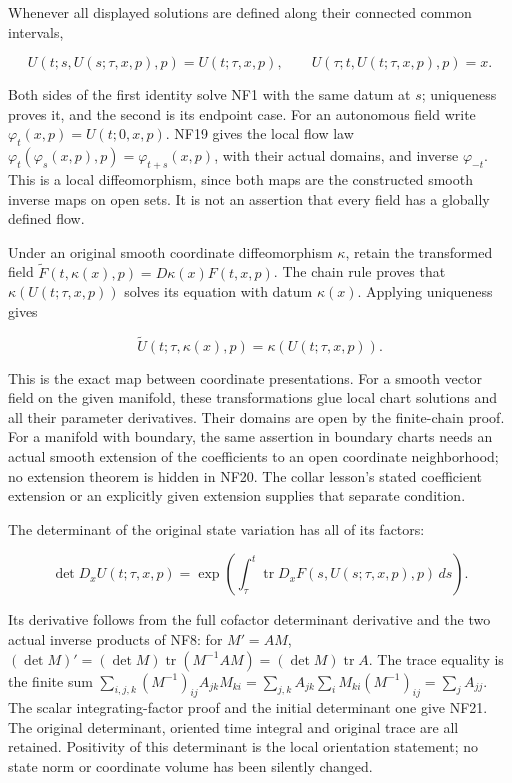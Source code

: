 \documentclass[
  11pt,
]{article}
\begin{document}
Whenever all displayed solutions are defined along their connected
common intervals,

\[
 U(t;s,U(s;\tau,x,p),p)=U(t;\tau,x,p),\qquad
 U(\tau;t,U(t;\tau,x,p),p)=x.
 \tag{NF19}
\]

Both sides of the first identity solve NF1 with the same datum at \(s\);
uniqueness proves it, and the second is its endpoint case. For an
autonomous field write \(\varphi_t(x,p)=U(t;0,x,p)\). NF19 gives the
local flow law \(\varphi_t(\varphi_s(x,p),p)=\varphi_{t+s}(x,p)\), with
their actual domains, and inverse \(\varphi_{-t}\). This is a local
diffeomorphism, since both maps are the constructed smooth inverse maps
on open sets. It is not an assertion that every field has a globally
defined flow.

Under an original smooth coordinate diffeomorphism \(\kappa\), retain
the transformed field
\(\widetilde F(t,\kappa(x),p)=D\kappa(x)F(t,x,p)\). The chain rule
proves that \(\kappa(U(t;\tau,x,p))\) solves its equation with datum
\(\kappa(x)\). Applying uniqueness gives

\[
 \widetilde U(t;\tau,\kappa(x),p)
       =\kappa(U(t;\tau,x,p)).
 \tag{NF20}
\]

This is the exact map between coordinate presentations. For a smooth
vector field on the given manifold, these transformations glue local
chart solutions and all their parameter derivatives. Their domains are
open by the finite-chain proof. For a manifold with boundary, the same
assertion in boundary charts needs an actual smooth extension of the
coefficients to an open coordinate neighborhood; no extension theorem is
hidden in NF20. The collar lesson's stated coefficient extension or an
explicitly given extension supplies that separate condition.

The determinant of the original state variation has all of its factors:

\[
 \det D_xU(t;\tau,x,p)
   =\exp\left(\int_\tau^t
             \operatorname{tr}D_xF(s,U(s;\tau,x,p),p)\,ds\right).
 \tag{NF21}
\]

Its derivative follows from the full cofactor determinant derivative and
the two actual inverse products of NF8: for \(M'=AM\),
\((\det M)'=(\det M)\operatorname{tr}(M^{-1}AM)
=(\det M)\operatorname{tr}A\). The trace equality is the finite sum
\(\sum_{i,j,k}(M^{-1})_{ij}A_{jk}M_{ki}
=\sum_{j,k}A_{jk}\sum_i M_{ki}(M^{-1})_{ij}
=\sum_jA_{jj}\). The scalar integrating-factor proof and the initial
determinant one give NF21. The original determinant, oriented time
integral and original trace are all retained. Positivity of this
determinant is the local orientation statement; no state norm or
coordinate volume has been silently changed.
\end{document}
